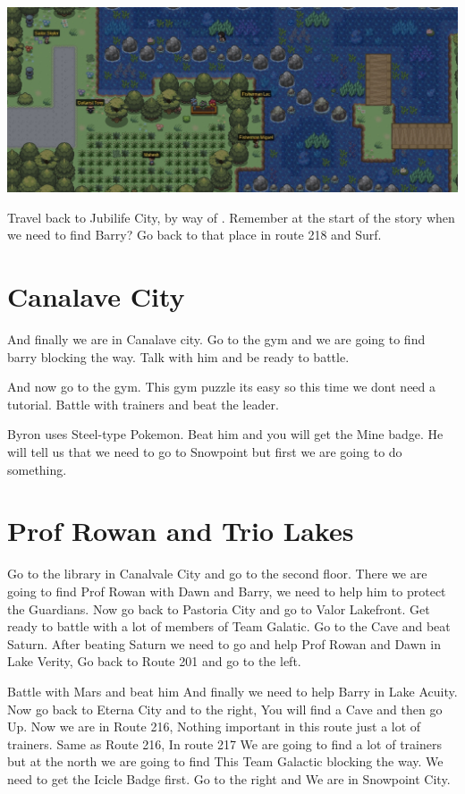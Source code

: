 \documentclass[11pt]{article}
\begin{document}
\includegraphics[width=\textwidth]{walkthrough/Sinnoh/Route_218}

Travel back to Jubilife City, by way of .
Remember at the start of the story when we need to find Barry?
Go back to that place in route 218 and Surf.

\section{Canalave City}\label{sec:canalave-city}

And finally we are in Canalave city.
Go to the gym and we are going to find barry blocking the way.
Talk with him and be ready to battle.

And now go to the gym.
This gym puzzle its easy so this time we dont need a tutorial.
Battle with trainers and beat the leader.

Byron uses Steel-type Pokemon.
Beat him and you will get the Mine badge.
He will tell us that we need to go to Snowpoint but first we are going to do something.

\section{Prof Rowan and Trio Lakes}\label{sec:prof-rowan-and-trio-lakes}
Go to the library in Canalvale City and go to the second floor.
There we are going to find Prof Rowan with Dawn and Barry,
we need to help him to protect the Guardians.
Now go back to Pastoria City and go to Valor Lakefront.
Get ready to battle with a lot of members of Team Galatic.
Go to the Cave and beat Saturn.
After beating Saturn we need to go and help Prof Rowan and Dawn in Lake Verity, Go back to Route 201 and go to the left.

Battle with Mars and beat him
And finally we need to help Barry in Lake Acuity.
Now go back to Eterna City and to the right, You will find a Cave and then go Up.
Now we are in Route 216, Nothing important in this route just a lot of trainers.
Same as Route 216, In route 217 We are going to find a lot of trainers
but at the north we are going to find This Team Galactic blocking the way.
We need to get the Icicle Badge first.
Go to the right and We are in Snowpoint City.
\end{document}
